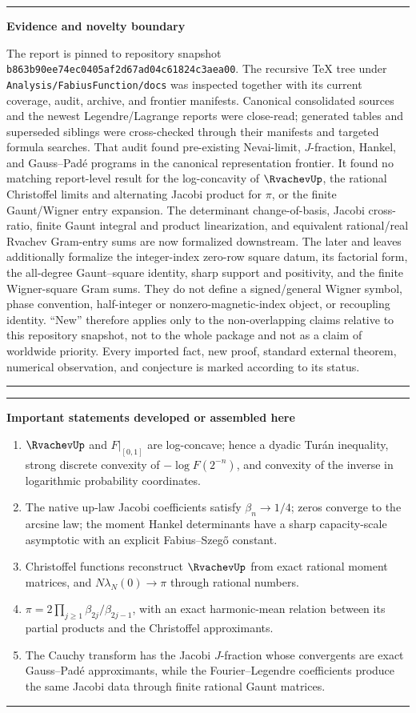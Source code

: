 \documentclass[11pt,oneside]{article}
\theoremstyle{definition}
\theoremstyle{remark}
\numberwithin{equation}{section}
\newenvironment{statusbox}[1]{%
  \par\smallskip\noindent\begin{center}\begin{minipage}{0.94\textwidth}%
  \hrule\vspace{0.55em}\noindent\textbf{#1}\par\smallskip
}{%
  \vspace{0.55em}\hrule\end{minipage}\end{center}\smallskip
}
\newcommand{\repo}{\nolinkurl{Analysis/FabiusFunction/docs}}
\newcommand{\commit}{\nolinkurl{b863b90ee74ec0405af2d67ad04c61824c3aea00}}
\begin{document}
\begin{statusbox}{Evidence and novelty boundary}
The report is pinned to repository snapshot \commit.  The recursive TeX tree
under \repo{} was inspected together with its current coverage, audit, archive,
and frontier manifests.  Canonical consolidated sources and the newest
Legendre/Lagrange reports were close-read; generated tables and superseded
siblings were cross-checked through their manifests and targeted formula
searches.  That audit found pre-existing Nevai-limit, $J$-fraction, Hankel, and
Gauss--Pad\'e programs in the canonical representation frontier.  It found no
matching report-level result for the log-concavity of $\RvachevUp$, the rational
Christoffel limits and alternating Jacobi product for $\pi$, or the finite
Gaunt/Wigner entry expansion.  The determinant change-of-basis, Jacobi
cross-ratio, finite Gaunt integral and product linearization, and equivalent
rational/real Rvachev Gram-entry sums are now formalized downstream.  The later
 and
 leaves additionally formalize the
integer-index zero-row square datum, its factorial form, the all-degree
Gaunt--square identity, sharp support and positivity, and the finite
Wigner-square Gram sums.  They do not define a signed/general Wigner symbol,
phase convention, half-integer or nonzero-magnetic-index object, or recoupling
identity.  ``New''
therefore applies only to the
non-overlapping claims relative to this repository snapshot, not to the whole
package and not as a claim of worldwide priority.  Every imported fact, new
proof, standard external theorem, numerical observation, and conjecture is
marked according to its status.
\end{statusbox}

\begin{statusbox}{Important statements developed or assembled here}
\begin{enumerate}
\item $\RvachevUp$ and $F|_{[0,1]}$ are log-concave; hence a dyadic Tur\'an inequality,
      strong discrete convexity of $-\log F(2^{-n})$, and convexity of the
      inverse in logarithmic probability coordinates.
\item The native up-law Jacobi coefficients satisfy $\beta_n\to1/4$; zeros
      converge to the arcsine law; the moment Hankel determinants have a sharp
      capacity-scale asymptotic with an explicit Fabius--Szeg\H{o} constant.
\item Christoffel functions reconstruct $\RvachevUp$ from exact rational moment
      matrices, and $N\lambda_N(0)\to\pi$ through rational numbers.
\item $\pi=2\prod_{j\ge1}\beta_{2j}/\beta_{2j-1}$, with an exact harmonic-mean
      relation between its partial products and the Christoffel approximants.
\item The Cauchy transform has the Jacobi $J$-fraction whose convergents are
      exact Gauss--Pad\'e approximants, while the Fourier--Legendre coefficients
      produce the same Jacobi data through finite rational Gaunt matrices.
\end{enumerate}
\end{statusbox}
\end{document}
